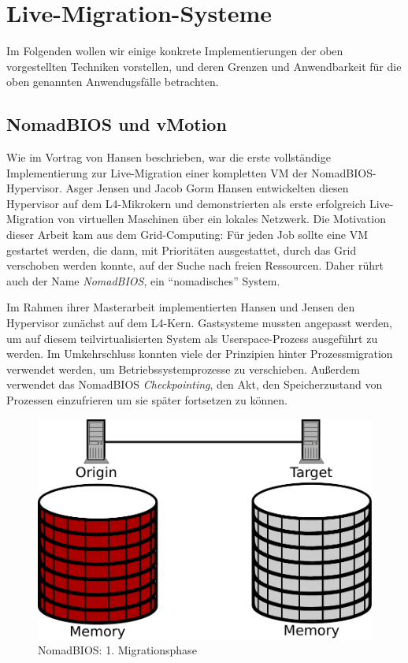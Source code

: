\section{Live-Migration-Systeme}
\label{sec:live-migr-syst}
Im Folgenden wollen wir einige konkrete Implementierungen der oben
vorgestellten Techniken vorstellen, und deren Grenzen und
Anwendbarkeit für die oben genannten Anwendugsfälle betrachten.

\subsection{NomadBIOS und vMotion}
\label{sec:nomadbios--vmware}
Wie im Vortrag von Hansen beschrieben, war die erste vollständige
Implementierung zur Live-Migration einer kompletten \ac{VM} der
NomadBIOS-Hypervisor. Asger Jensen und Jacob Gorm Hansen entwickelten diesen
Hypervisor auf dem L4-Mikrokern und demonstrierten als erste
erfolgreich Live-Migration von virtuellen Maschinen über ein lokales
Netzwerk. Die Motivation dieser Arbeit kam aus dem Grid-Computing: Für
jeden Job sollte eine \ac{VM} gestartet werden, die dann, mit
Prioritäten ausgestattet, durch das Grid verschoben werden konnte, auf
der Suche nach freien Ressourcen. Daher rührt auch der Name
\emph{NomadBIOS}, ein "`nomadisches"' System.

Im Rahmen ihrer Masterarbeit implementierten Hansen und
Jensen den Hypervisor zunächst auf dem L4-Kern. Gastsysteme
mussten angepasst werden, um auf diesem teilvirtualisierten System als
Userspace-Prozess ausgeführt zu werden. Im Umkehrschluss konnten viele
der Prinzipien hinter Prozessmigration verwendet werden, um
Betriebssystemprozesse zu verschieben. Außerdem verwendet das
NomadBIOS \emph{Checkpointing}, den Akt, den Speicherzustand von
Prozessen einzufrieren um sie später fortsetzen zu können.

\begin{figure}[htbp]
  \centering
  \includegraphics[width=0.7\linewidth]{images/nomad_stage1}
  \caption{NomadBIOS: 1. Migrationsphase}
  \label{fig:nomad_stage1}
\end{figure}


